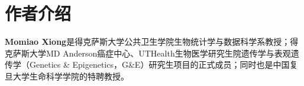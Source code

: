 \chapter*{作者介绍}

\textbf{Momiao Xiong}是得克萨斯大学公共卫生学院生物统计学与数据科学系教授；得克萨斯大学MD Anderson癌症中心、UTHealth生物医学研究生院遗传学与表观遗传学（Genetics \& Epigenetics，G\&E）研究生项目的正式成员；同时也是中国复旦大学生命科学学院的特聘教授。
